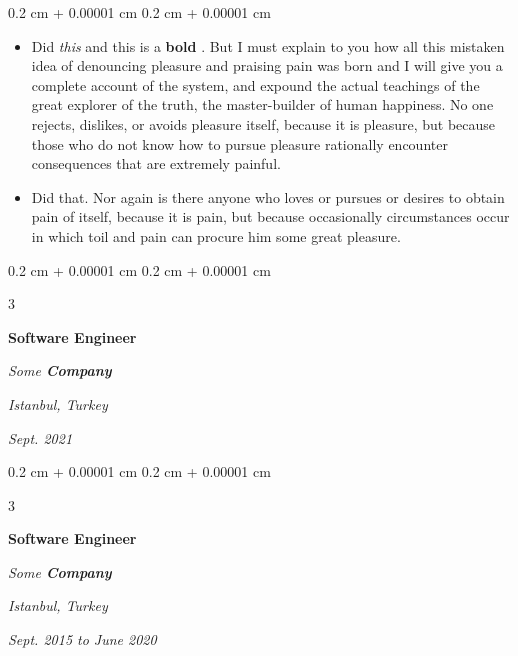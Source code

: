\documentclass[10pt, letterpaper]{article}
\newenvironment{highlights}{
    \begin{itemize}[
        topsep=0.10 cm,
        parsep=0.10 cm,
        partopsep=0pt,
        itemsep=0pt,
        leftmargin=0.4 cm + 10pt + 0.6 cm
    ]
}{
    \end{itemize}
} %
\newenvironment{onecolentry}{
    \begin{adjustwidth}{
        0.2 cm + 0.00001 cm
    }{
        0.2 cm + 0.00001 cm
    }
}{
    \end{adjustwidth}
} %
\newenvironment{threecolentry}[3][]{
    \onecolentry
    \def\thirdColumn{#3}
    \setcolumnwidth{0.6 cm, \fill, 4.5 cm}
    \begin{paracol}{3}
    #2 \switchcolumn
}{
    \switchcolumn \raggedleft \thirdColumn
    \end{paracol}
    \endonecolentry
} %
\let\hrefWithoutArrow\href
\renewcommand{\href}[2]{\hrefWithoutArrow{#1}{\mbox{\ifthenelse{\equal{#2}{}}{ }{#2 }\raisebox{.15ex}{\footnotesize \faExternalLink*}}}}
\begin{document}
        \vspace{0.10 cm-3px}
        \begin{onecolentry}
            \begin{highlights}
                \item Did \textit{this} and this is a \textbf{bold} \href{https://example.com}{link}. But I must explain to you how all this mistaken idea of denouncing pleasure and praising pain was born and I will give you a complete account of the system, and expound the actual teachings of the great explorer of the truth, the master-builder of human happiness. No one rejects, dislikes, or avoids pleasure itself, because it is pleasure, but because those who do not know how to pursue pleasure rationally encounter consequences that are extremely painful.
                \item Did that. Nor again is there anyone who loves or pursues or desires to obtain pain of itself, because it is pain, but because occasionally circumstances occur in which toil and pain can procure him some great pleasure.
            \end{highlights}
        \end{onecolentry}


        \vspace{0.2 cm-3px}

        \begin{threecolentry}{
            \vspace*{\fill}
            \textbullet
            \vspace*{3px}
            \vspace*{\fill}
        }{
        \textit{Istanbul, Turkey}    
            
        \textit{Sept. 2021}}
            \textbf{Software Engineer}
            
            \textit{Some \textbf{Company}}
        \end{threecolentry}



        \vspace{0.2 cm-3px}

        \begin{threecolentry}{
            \vspace*{\fill}
            \textbullet
            \vspace*{3px}
            \vspace*{\fill}
        }{
        \textit{Istanbul, Turkey}    
            
        \textit{Sept. 2015 to June 2020}}
            \textbf{Software Engineer}
            
            \textit{Some \textbf{Company}}
        \end{threecolentry}
\end{document}
